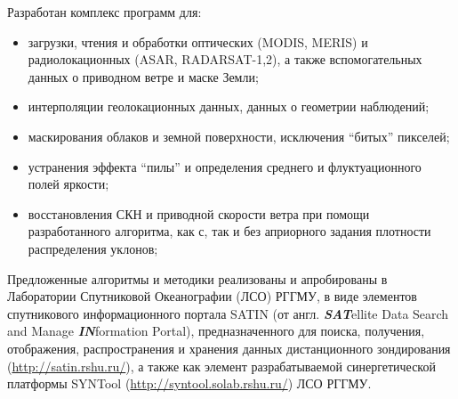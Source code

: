 Разработан комплекс программ для:
\begin{itemize}
\item загрузки, чтения и обработки оптических (MODIS, MERIS) и радиолокационных (ASAR, RADARSAT-1,2), а также вспомогательных данных о приводном ветре и маске Земли;
\item интерполяции геолокационных данных, данных о геометрии наблюдений;
\item маскирования облаков и земной поверхности, исключения ``битых'' пикселей;
\item устранения эффекта ``пилы'' и определения среднего и флуктуационного полей яркости;
\item восстановления СКН и приводной скорости ветра при помощи разработанного алгоритма, как с, так и без априорного задания плотности распределения уклонов;
\end{itemize}

Предложенные алгоритмы и методики реализованы и апробированы в Лаборатории Спутниковой Океанографии (ЛСО) РГГМУ, в виде элементов спутникового информационного портала SATIN (от англ. \textit{\textbf{SAT}}ellite Data Search and Manage \textit{\textbf{IN}}formation Portal), предназначенного для поиска, получения, отображения, распространения и хранения данных дистанционного зондирования (\url{http://satin.rshu.ru/}), а также как элемент разрабатываемой синергетической платформы SYNTool (\url{http://syntool.solab.rshu.ru/}) ЛСО РГГМУ.





\clearpage
